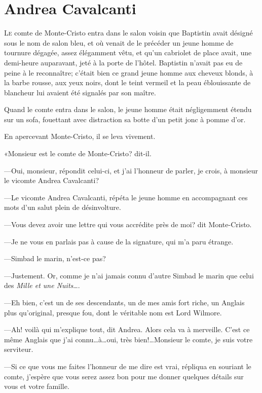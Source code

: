 \chapter{Andrea Cavalcanti}

\lettrine{L}{e} comte de Monte-Cristo entra dans le salon voisin que Baptistin avait désigné sous le nom de salon bleu, et où venait de le précéder un jeune homme de tournure dégagée, assez élégamment vêtu, et qu'un cabriolet de place avait, une demi-heure auparavant, jeté à la porte de l'hôtel. Baptistin n'avait pas eu de peine à le reconnaître; c'était bien ce grand jeune homme aux cheveux blonds, à la barbe rousse, aux yeux noirs, dont le teint vermeil et la peau éblouissante de blancheur lui avaient été signalés par son maître. 

Quand le comte entra dans le salon, le jeune homme était négligemment étendu sur un sofa, fouettant avec distraction sa botte d'un petit jonc à pomme d'or. 

En apercevant Monte-Cristo, il se leva vivement. 

«Monsieur est le comte de Monte-Cristo? dit-il. 

—Oui, monsieur, répondit celui-ci, et j'ai l'honneur de parler, je crois, à monsieur le vicomte Andrea Cavalcanti? 

—Le vicomte Andrea Cavalcanti, répéta le jeune homme en accompagnant ces mots d'un salut plein de désinvolture. 

—Vous devez avoir une lettre qui vous accrédite près de moi? dit Monte-Cristo. 

—Je ne vous en parlais pas à cause de la signature, qui m'a paru étrange. 

—Simbad le marin, n'est-ce pas? 

—Justement. Or, comme je n'ai jamais connu d'autre Simbad le marin que celui des \textit{Mille et une Nuits}\dots. 

—Eh bien, c'est un de ses descendants, un de mes amis fort riche, un Anglais plus qu'original, presque fou, dont le véritable nom est Lord Wilmore. 

—Ah! voilà qui m'explique tout, dit Andrea. Alors cela va à merveille. C'est ce même Anglais que j'ai connu\dots à\dots oui, très bien!\dots Monsieur le comte, je suis votre serviteur. 

—Si ce que vous me faites l'honneur de me dire est vrai, répliqua en souriant le comte, j'espère que vous serez assez bon pour me donner quelques détails sur vous et votre famille. 

